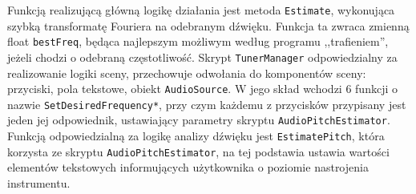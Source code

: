 Funkcją realizującą główną logikę działania jest metoda \texttt{Estimate}, wykonująca szybką transformatę Fouriera na odebranym dźwięku. Funkcja ta zwraca zmienną float \texttt{bestFreq}, będąca najlepszym możliwym według programu ,,trafieniem'', jeżeli chodzi o odebraną częstotliwość. Skrypt \texttt{TunerManager} odpowiedzialny za realizowanie logiki sceny, przechowuje odwołania do komponentów sceny: przyciski, pola tekstowe, obiekt \texttt{AudioSource}. W jego skład wchodzi 6 funkcji o nazwie \texttt{SetDesiredFrequency*}, przy czym każdemu z przycisków przypisany jest jeden jej odpowiednik, ustawiający parametry skryptu \texttt{AudioPitchEstimator}. Funkcją odpowiedzialną za logikę analizy dźwięku jest \texttt{EstimatePitch}, która korzysta ze skryptu \texttt{AudioPitchEstimator}, na tej podstawia ustawia wartości elementów tekstowych informujących użytkownika o poziomie nastrojenia instrumentu. 

